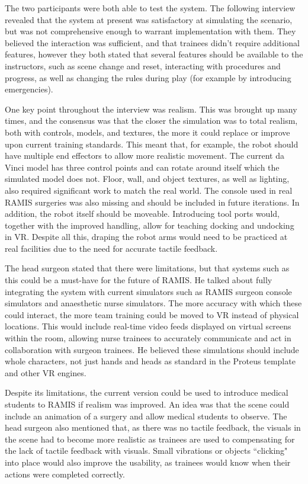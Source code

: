 The two participants were both able to test the system. The following interview revealed that the system at present was satisfactory at simulating the scenario, but was not comprehensive enough to warrant implementation with them. They believed the interaction was sufficient, and that trainees didn't require additional features, however they both stated that several features should be available to the instructors, such as scene change and reset, interacting with procedures and progress, as well as changing the rules during play (for example by introducing emergencies).

One key point throughout the interview was realism. This was brought up many times, and the consensus was that the closer the simulation was to total realism, both with controls, models, and textures, the more it could replace or improve upon current training standards. This meant that, for example, the robot should have multiple end effectors to allow more realistic movement. The current da Vinci model has three control points and can rotate around itself which the simulated model does not. Floor, wall, and object textures, as well as lighting, also required significant work to match the real world. The console used in real RAMIS surgeries was also missing and should be included in future iterations. In addition, the robot itself should be moveable. Introducing tool ports would, together with the improved handling, allow for teaching docking and undocking in VR. Despite all this, draping the robot arms would need to be practiced at real facilities due to the need for accurate tactile feedback.

The head surgeon stated that there were limitations, but that systems such as this could be a must-have for the future of RAMIS. He talked about fully integrating the system with current simulators such as RAMIS surgeon console simulators and anaesthetic nurse simulators. The more accuracy with which these could interact, the more team training could be moved to VR instead of physical locations. This would include real-time video feeds displayed on virtual screens within the room, allowing nurse trainees to accurately communicate and act in collaboration with surgeon trainees. He believed these simulations should include whole characters, not just hands and heads as standard in the Proteus template and other VR engines.

Despite its limitations, the current version could be used to introduce medical students to RAMIS if realism was improved. An idea was that the scene could include an animation of a surgery and allow medical students to observe. The head surgeon also mentioned that, as there was no tactile feedback, the visuals in the scene had to become more realistic as trainees are used to compensating for the lack of tactile feedback with visuals. Small vibrations or objects ``clicking" into place would also improve the usability, as trainees would know when their actions were completed correctly.

